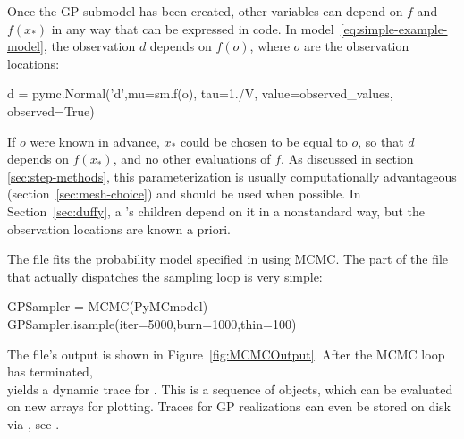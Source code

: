 \documentclass[article]{jss}
\begin{document}
Once the GP submodel has been created, other variables can depend on $f$ and $f(x_*)$ in any way that can be expressed in  code. In model~\ref{eq:simple-example-model}, the observation $d$ depends on $f(o)$, where $o$ are the observation locations:
\begin{CodeChunk}
\begin{CodeInput}
d = pymc.Normal('d',mu=sm.f(o), tau=1./V, value=observed_values, observed=True)
\end{CodeInput}
\end{CodeChunk}
If $o$ were known in advance, $x_*$ could be chosen to be equal to $o$, so that $d$ depends on $f(x_*)$, and no other evaluations of $f$. As discussed in section \ref{sec:step-methods}, this parameterization is usually computationally advantageous (section~\ref{sec:mesh-choice}) and should be used when possible. In Section~\ref{sec:duffy}, a 's children depend on it in a nonstandard way, but the observation locations are known a priori. 

The file  fits the probability model specified in  using MCMC. The part of the file that actually dispatches the sampling loop is very simple:
\begin{CodeChunk}
\begin{CodeInput}
GPSampler = MCMC(PyMCmodel)
GPSampler.isample(iter=5000,burn=1000,thin=100)    
\end{CodeInput}
\end{CodeChunk}
The file's output is shown in Figure~\ref{fig:MCMCOutput}. After the MCMC loop has terminated, \\ yields a dynamic trace for . This is a sequence of  objects, which can be evaluated on new arrays for plotting. Traces for GP realizations can even be stored on disk via  \citep{tables}, see \cite{pymc}.
\end{document}
